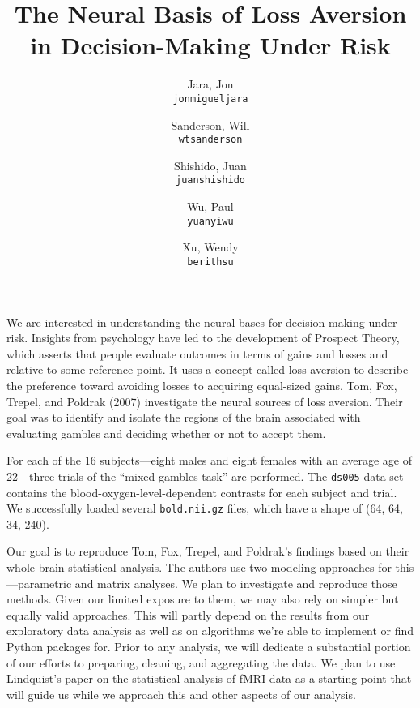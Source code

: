 \documentclass[11pt]{article}
\title{The Neural Basis of Loss Aversion in Decision-Making Under Risk}
\author{
  Jara, Jon\\
  \texttt{jonmigueljara}
  \and
  Sanderson, Will\\
  \texttt{wtsanderson}
  \and
  Shishido, Juan\\
  \texttt{juanshishido}
  \and
  Wu, Paul\\
  \texttt{yuanyiwu}
  \and
  Xu, Wendy\\
  \texttt{berithsu}
}
\begin{document}
\maketitle

We are interested in understanding the neural bases for decision making under
risk. Insights from psychology have led to the development of Prospect Theory,
which asserts that people evaluate outcomes in terms of gains and losses and
relative to some reference point\cite{kahnemantversky}. It uses a concept
called loss aversion to describe the preference toward avoiding losses to
acquiring equal-sized gains. Tom, Fox, Trepel, and Poldrak (2007) investigate
the neural sources of loss aversion. Their goal was to identify and isolate the
regions of the brain associated with evaluating gambles and deciding whether or
not to accept them.

For each of the 16 subjects---eight males and eight females with an average
age of 22---three trials of the ``mixed gambles task'' are performed. The
\lstinline{ds005} data set contains the blood-oxygen-level-dependent contrasts
for each subject and trial. We successfully loaded several
\lstinline{bold.nii.gz} files, which have a shape of (64, 64, 34, 240).

Our goal is to reproduce Tom, Fox, Trepel, and Poldrak's findings based on
their whole-brain statistical analysis. The authors use two modeling approaches
for this---parametric and matrix analyses. We plan to investigate and reproduce 
those methods. Given our limited exposure to them, we may also rely on simpler 
but equally valid approaches. This will partly depend on the results from our
exploratory data analysis as well as on algorithms we're able to implement or
find Python packages for. Prior to any analysis, we will dedicate a substantial
portion of our efforts to preparing, cleaning, and aggregating the data. We plan 
to use Lindquist's paper on the statistical analysis of fMRI data\cite{lindquist} 
as a starting point that will guide us while we approach this and other aspects 
of our analysis.


\end{document}
